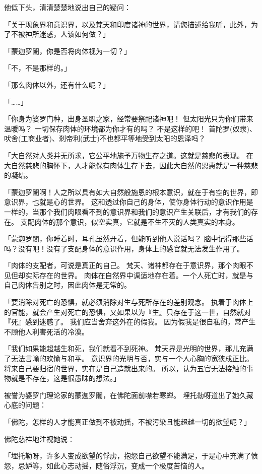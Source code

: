 \documentclass[twoside,openany]{book}
\begin{document}
他低下头，清清楚楚地说出自己的疑问：

「关于现象界和意识界，以及梵天和印度诸神的世界，请您描述给我听，此外，为了不被神所迷惑，人该如何做？」

「蒙迦罗闍，你是否将肉体视为一切？」

「不，不是那样的。」

「那么肉体以外，还有什么呢？」

「……」

「你身为婆罗门种，出身圣职之家，经常要祭祀诸神吧！
但太阳光只为你们带来温暖吗？
一切保存肉体的环境都为你才有的吗？
不是这样的吧！
首陀罗(奴隶)、吠舍(工商业者)、刹帝利(武士)不也都平等地受到太阳的恩泽吗？

「大自然对人类并无所求，它公平地施予万物生存之道。这就是慈悲的表现。
在大自然慈悲的胸怀下，人才能保有肉体生存下去，因此大自然的恩惠就是一种慈悲的凝结。

「蒙迦罗闍啊！人之所以具有如大自然般施恩的根本意识，就在于有空的世界，即意识界，也就是心的世界。
这和透过你自己的身体，使你身体行动的意识作用是一样的，当那个我们肉眼看不到的意识界和我们的意识产生关联后，才有我们的存在。
支配肉体的那个意识，似空实真，它就是不生不灭的人类真实的本身。

「蒙迦罗闍，你睡着时，耳孔虽然开着，但能听到他人说话吗？
脑中记得那些话吗？没有吧！没有了支配身体的意识作用，身体上的感官就无法发生作用了。

「肉体的支配者，可说是真正的自己。
梵天、诸神都存在于意识界，那个肉眼不见但却实际存在的世界。
肉体在自然界中调适地存在着。一个人死亡时，就是与自己肉体告别之时，因此肉体是无常的。

「要消除对死亡的恐惧，就必须消除对生与死所存在的差别观念。
执着于肉体上的官能，就会产生对死亡的恐惧，又如果以为『生』只存在于这一世，自然就对『死』感到迷惑了。
我们应当舍弃这外在的假我。
因为假我是很自私的，常产生不顾他人利害死活的冷漠。

「我们如果能超越生和死，我们就看不到死神。
梵天界是光明的世界，那儿充满了无法言喻的欢愉与和平。
意识界的光明与否，实与一个人心胸的宽狭成正比。
将来自己要归宿的世界，实在是自己造就出来的。
所以，认为五官无法接触的事物就是不存在，这是很愚昧的想法。」

被誉为婆罗门理论家的蒙迦罗闍，在佛陀面前噤若寒蝉。
埋托勒呀道出了她久藏心底的问题：

「佛陀，怎样的人才能真正做到不被动摇，不被污染且能超越一切的欲望呢？」

佛陀慈祥地注视她说：

「埋托勒呀，许多人变成欲望的俘虏，抱怨自己欲望不能满足，于是心中充满了愤怨，忌妒等，如此心志动摇，随俗浮沉，变成一个极度苦恼的人。
\end{document}
